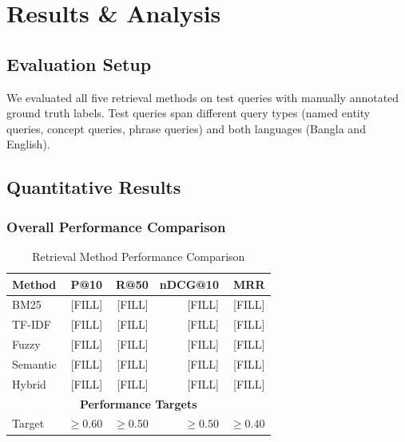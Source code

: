 \documentclass[12pt,a4paper]{report}
\begin{document}
\newpage

\chapter{Results \& Analysis}

\section{Evaluation Setup}

We evaluated all five retrieval methods on test queries with manually annotated ground truth labels. Test queries span different query types (named entity queries, concept queries, phrase queries) and both languages (Bangla and English).

\section{Quantitative Results}

\subsection{Overall Performance Comparison}

\begin{table}[H]
    \centering
    \begin{tabular}{|l|r|r|r|r|}
        \hline
        \textbf{Method} & \textbf{P@10} & \textbf{R@50} & \textbf{nDCG@10} & \textbf{MRR} \\
        \hline
        BM25 & [FILL] & [FILL] & [FILL] & [FILL] \\
        \hline
        TF-IDF & [FILL] & [FILL] & [FILL] & [FILL] \\
        \hline
        Fuzzy & [FILL] & [FILL] & [FILL] & [FILL] \\
        \hline
        Semantic & [FILL] & [FILL] & [FILL] & [FILL] \\
        \hline
        Hybrid & [FILL] & [FILL] & [FILL] & [FILL] \\
        \hline
        \multicolumn{5}{|c|}{\textbf{Performance Targets}} \\
        \hline
        Target & $\geq 0.60$ & $\geq 0.50$ & $\geq 0.50$ & $\geq 0.40$ \\
        \hline
    \end{tabular}
    \caption{Retrieval Method Performance Comparison}
\end{table}
\end{document}
